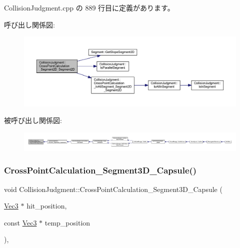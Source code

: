  Collision\+Judgment.\+cpp の 889 行目に定義があります。

呼び出し関係図\+:\nopagebreak
\begin{figure}[H]
\begin{center}
\leavevmode
\includegraphics[width=350pt]{class_collision_judgment_a25e0fb020e2a075322c9540bdd13b6c2_cgraph}
\end{center}
\end{figure}
被呼び出し関係図\+:
\nopagebreak
\begin{figure}[H]
\begin{center}
\leavevmode
\includegraphics[width=350pt]{class_collision_judgment_a25e0fb020e2a075322c9540bdd13b6c2_icgraph}
\end{center}
\end{figure}
\mbox{\label{class_collision_judgment_a9d7bd7435d9e116c8d0dfb62662e60d5}} 
\subsubsection{\texorpdfstring{Cross\+Point\+Calculation\+\_\+\+Segment3\+D\+\_\+\+Capsule()}{CrossPointCalculation\_Segment3D\_Capsule()}}
{\footnotesize\ttfamily void Collision\+Judgment\+::\+Cross\+Point\+Calculation\+\_\+\+Segment3\+D\+\_\+\+Capsule (\begin{DoxyParamCaption}\item[{\mbox{\hyperlink{_vector3_d_8h_ab16f59e4393f29a01ec8b9bbbabbe65d}{Vec3}} $\ast$}]{hit\+\_\+position,  }\item[{const \mbox{\hyperlink{_vector3_d_8h_ab16f59e4393f29a01ec8b9bbbabbe65d}{Vec3}} $\ast$}]{temp\+\_\+position }\end{DoxyParamCaption})\hspace{0.3cm}{\ttfamily [static]}, {\ttfamily [private]}}



